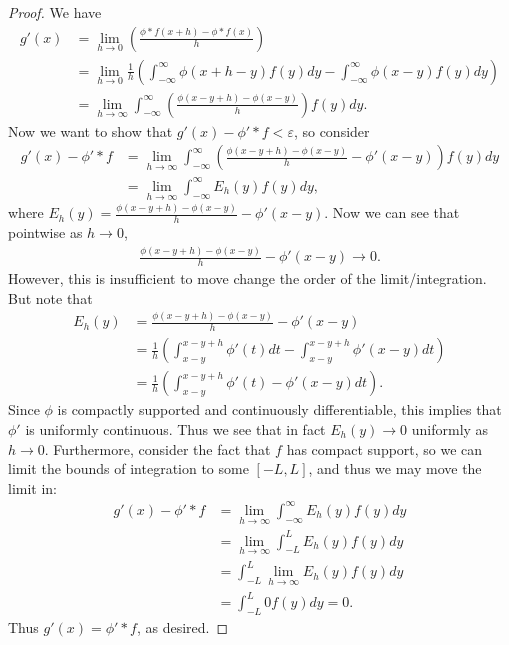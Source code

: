 \documentclass[12pt]{article}
\theoremstyle{remark}
\theoremstyle{named}
\newcommand{\e}{\varepsilon}
\begin{document}
\begin{proof}
    We have 
    \begin{align*}
        g'(x) &= \lim_{h \to 0} \left(\frac{\phi * f (x + h) - \phi * f (x)}{h}\right) \\
        &= \lim_{h \to 0} \frac{1}{h} \left(\int_{-\infty}^{\infty}\phi(x + h - y) f(y) dy - \int_{-\infty}^{\infty}\phi(x - y) f(y) dy\right) \\
        &=  \lim_{h \to \infty} \int_{-\infty}^{\infty} \left( \frac{\phi(x - y + h) - \phi(x - y)}{h}\right)f(y) dy.
    \end{align*}
    Now we want to show that \(g'(x) - \phi' * f < \e\), so consider
    \begin{align*}
        g'(x) - \phi' * f &= \lim_{h \to \infty} \int_{-\infty}^{\infty} \left( \frac{\phi(x - y + h) - \phi(x - y)}{h} - \phi'(x - y) \right)f(y) dy \\
        &= \lim_{h \to \infty} \int_{-\infty}^{\infty} E_h(y)f(y) dy,
    \end{align*}
    where \(E_h(y) = \frac{\phi(x - y + h) - \phi(x - y)}{h} - \phi'(x - y)\).
    Now we can see that pointwise as \(h \to 0\),
    \begin{align*}
        \frac{\phi(x - y + h) - \phi(x - y)}{h} - \phi'(x - y) \to 0.
    \end{align*}
    However, this is insufficient to move change the order of the limit/integration. But note that 
    \begin{align*}
        E_h(y) &= \frac{\phi(x - y + h) - \phi(x - y)}{h} - \phi'(x - y) \\
        &= \frac{1}{h} \left( \int_{x - y}^{x - y + h} \phi'(t) dt - \int_{x - y}^{x - y + h} \phi'(x - y) dt \right) \\
        &= \frac{1}{h} \left( \int_{x - y}^{x - y + h} \phi'(t) - \phi'(x - y) dt \right).
    \end{align*}
    Since \(\phi\) is compactly supported and continuously differentiable, this implies that \(\phi'\) is uniformly continuous. Thus we see that in fact \(E_h(y) \to 0\) uniformly as \(h \to 0\). Furthermore, consider the fact that \(f\) has compact support, so we can limit the bounds of integration to some \([-L, L]\), and thus we may move the limit in:
    \begin{align*}
        g'(x) - \phi' * f &= \lim_{h \to \infty} \int_{-\infty}^{\infty} E_h(y)f(y) dy \\
        &= \lim_{h \to \infty} \int_{-L}^{L} E_h(y)f(y) dy \\
        &= \int_{-L}^{L} \lim_{h \to \infty} E_h(y) f(y) dy \\
        &= \int_{-L}^{L} 0 f(y) dy = 0.
    \end{align*}
    Thus \(g'(x) = \phi' * f\), as desired.
\end{proof}
\end{document}
